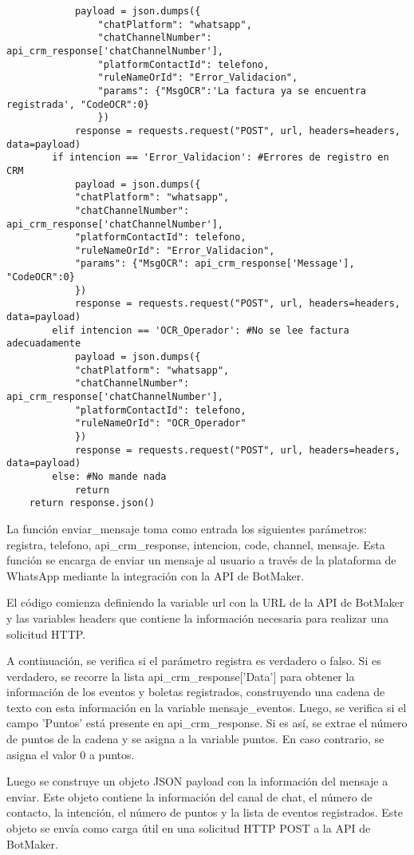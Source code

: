 \documentclass{article}
\begin{document}
\begin{lstlisting}
            payload = json.dumps({
                "chatPlatform": "whatsapp",
                "chatChannelNumber": api_crm_response['chatChannelNumber'],
                "platformContactId": telefono,
                "ruleNameOrId": "Error_Validacion",
                "params": {"MsgOCR":'La factura ya se encuentra registrada', "CodeOCR":0}
                })
            response = requests.request("POST", url, headers=headers, data=payload)
        if intencion == 'Error_Validacion': #Errores de registro en CRM
            payload = json.dumps({
            "chatPlatform": "whatsapp",
            "chatChannelNumber": api_crm_response['chatChannelNumber'],
            "platformContactId": telefono,
            "ruleNameOrId": "Error_Validacion",
            "params": {"MsgOCR": api_crm_response['Message'], "CodeOCR":0}
            })
            response = requests.request("POST", url, headers=headers, data=payload)
        elif intencion == 'OCR_Operador': #No se lee factura adecuadamente
            payload = json.dumps({
            "chatPlatform": "whatsapp",
            "chatChannelNumber": api_crm_response['chatChannelNumber'],
            "platformContactId": telefono,
            "ruleNameOrId": "OCR_Operador"
            })
            response = requests.request("POST", url, headers=headers, data=payload)
        else: #No mande nada
            return 
    return response.json()
\end{lstlisting}
La función enviar\_mensaje toma como entrada los siguientes parámetros: registra, telefono, api\_crm\_response, intencion, code, channel, mensaje. Esta función se encarga de enviar un mensaje al usuario a través de la plataforma de WhatsApp mediante la integración con la API de BotMaker.

El código comienza definiendo la variable url con la URL de la API de BotMaker y las variables headers que contiene la información necesaria para realizar una solicitud HTTP.

A continuación, se verifica si el parámetro registra es verdadero o falso. Si es verdadero, se recorre la lista api\_crm\_response['Data'] para obtener la información de los eventos y boletas registrados, construyendo una cadena de texto con esta información en la variable mensaje\_eventos. Luego, se verifica si el campo 'Puntos' está presente en api\_crm\_response. Si es así, se extrae el número de puntos de la cadena y se asigna a la variable puntos. En caso contrario, se asigna el valor 0 a puntos.

Luego se construye un objeto JSON payload con la información del mensaje a enviar. Este objeto contiene la información del canal de chat, el número de contacto, la intención, el número de puntos y la lista de eventos registrados. Este objeto se envía como carga útil en una solicitud HTTP POST a la API de BotMaker.
\end{document}
